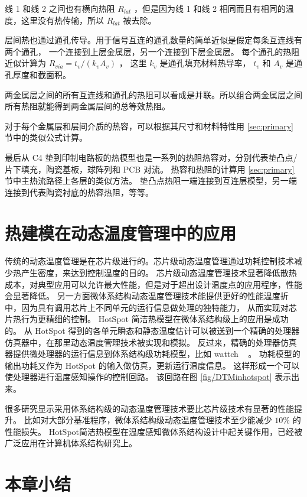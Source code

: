 线 1 和线 2 之间也有横向热阻 $R_{lat}$ ，但是因为线 1 和线 2 相同而且有相同的温度，这里没有热传输，所以 $R_{lat}$ 被去除。

层间热也通过通孔传导。用于信号互连的通孔数量的简单近似是假定每条互连线有两个通孔，
一个连接到上层金属层，另一个连接到下层金属层。
每个通孔的热阻近似计算为 $R_{via} = t_v/(k_vA_v)$ ， 这里 $k_v$ 是通孔填充材料热导率， $t_v$ 和 $A_v$ 是通孔厚度和截面积。

两金属层之间的所有互连线和通孔的热阻可以看成是并联。所以组合两金属层之间所有热阻就能得到两金属层间的总等效热阻。

对于每个金属层和层间介质的热容，可以根据其尺寸和材料特性用 \ref{sec:primary} 节中的类似公式计算。

最后从 C4 垫到印制电路板的热模型也是一系列的热阻热容对，分别代表垫凸点/片下填充，陶瓷基板，球阵列和 PCB 对流。
热容和热阻的计算用 \ref{sec:primary} 节中主热流路径上各层的类似方法。
垫凸点热阻一端连接到互连层模型，另一端连接到代表陶瓷衬底的热容热阻，等等。

\section{热建模在动态温度管理中的应用}\label{sec:hotspotinDTM}

传统的动态温度管理是在芯片级进行的。芯片级动态温度管理通过功耗控制技术减少热产生密度，来达到控制温度的目的。
芯片级动态温度管理技术显著降低散热成本，对典型应用可以允许最大性能，但是对于超出设计温度点的应用程序，性能会显著降低。
另一方面微体系结构动态温度管理技术能提供更好的性能温度折中，因为具有调用芯片上不同单元的运行信息做处理的独特能力，
从而实现对芯片热行为更精细的控制。
HotSpot 简洁热模型在微体系结构级上的应用是成功的。
从 HotSpot 得到的各单元瞬态和静态温度估计可以被送到一个精确的处理器仿真器中，在那里动态温度管理技术被实现和模拟。
反过来，精确的处理器仿真器提供微处理器的运行信息到体系结构级功耗模型，比如 wattch ~\cite{Brooks:ISCA'00} 。
功耗模型的输出功耗又作为 HotSpot 的输入做仿真，更新运行温度信息。
这样形成一个可以使处理器进行温度感知操作的控制回路。
该回路在图 \ref{fig/DTMinhotspot} 表示出来。

很多研究显示采用体系结构级的动态温度管理技术要比芯片级技术有显著的性能提升。
比如对大部分基准程序，微体系结构级动态温度管理技术至少能减少 $10\%$ 的性能损失。
HotSpot简洁热模型在温度感知微体系结构设计中起关键作用，已经被广泛应用在计算机体系结构研究上。\\


\section{本章小结}\label{sec:xiaojie3}

